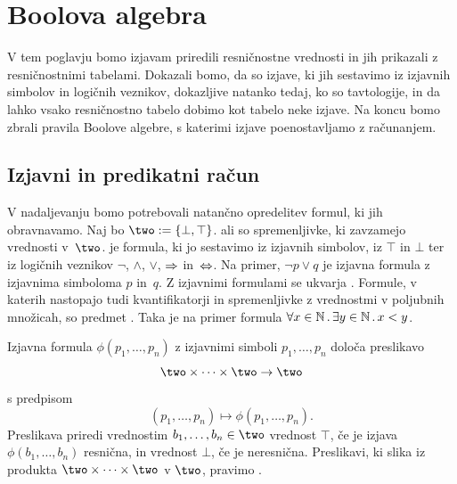 \chapter{Boolova algebra}
\label{cha:boolova-algebra}

V tem poglavju bomo izjavam priredili resničnostne vrednosti in jih prikazali z resničnostnimi tabelami.
%
Dokazali bomo, da so izjave, ki jih sestavimo iz izjavnih simbolov in logičnih veznikov, dokazljive natanko tedaj, ko so tavtologije, in da lahko vsako resničnostno tabelo dobimo kot tabelo neke izjave.
%
Na koncu bomo zbrali pravila Boolove algebre, s katerimi izjave poenostavljamo z računanjem.

\section{Izjavni in predikatni račun}

V nadaljevanju bomo potrebovali natančno opredelitev formul, ki jih obravnavamo.
%
Naj bo $\two \defeq \set{\bot, \top}$.
%
 ali  so spremenljivke, ki zavzamejo vrednosti v~$\two$.
%
 je formula, ki jo sestavimo iz izjavnih simbolov, iz $\top$ in $\bot$ ter iz logičnih veznikov $\neg$, $\land$, $\lor$, $\Rightarrow$ in~$\Leftrightarrow$.
%
Na primer, $\neg p \lor q$ je izjavna formula z izjavnima simboloma $p$ in~$q$.
%
Z izjavnimi formulami se ukvarja .
%
Formule, v katerih nastopajo tudi kvantifikatorji in spremenljivke z vrednostmi v poljubnih množicah, so predmet .
%
Taka je na primer formula $\forall x \in \mathbb{N} \,.\, \exists y \in \mathbb{N} \,.\, x < y$.

Izjavna formula $\phi(p_1, \ldots, p_n)$ z izjavnimi simboli $p_1, \ldots, p_n$ določa preslikavo
%
\begin{equation*}
  \two \times \cdots \times \two \to \two
\end{equation*}
%
s predpisom
%
\begin{equation*}
  (p_1, \ldots, p_n) \mapsto \phi(p_1, \ldots, p_n).
\end{equation*}
%
Preslikava priredi vrednostim $b_1, \ldots, b_n \in \two$ vrednost $\top$, če je izjava $\phi(b_1, \ldots, b_n)$ resnična, in vrednost $\bot$, če je neresnična.
%
Preslikavi, ki slika iz produkta $\two \times \cdots \times \two$ v $\two$, pravimo .

